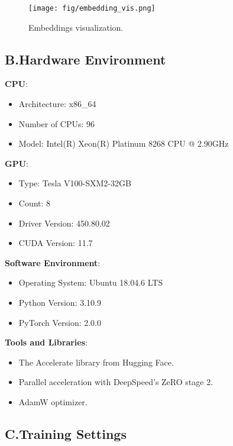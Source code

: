 \documentclass{article}
\begin{document}
\begin{figure*}[t!]
\centering
\texttt{[image: fig/embedding\_vis.png]}
\caption{Embeddings visualization.}
\label{fig: embedding_vis}
\end{figure*}

\subsection*{B.Hardware Environment}
\textbf{CPU}:
\begin{itemize}
\item Architecture: x86\_64
\item Number of CPUs: 96
\item Model: Intel(R) Xeon(R) Platinum 8268 CPU @ 2.90GHz
\end{itemize}

\textbf{GPU}:
\begin{itemize}
\item Type: Tesla V100-SXM2-32GB
\item Count: 8
\item Driver Version: 450.80.02
\item CUDA Version: 11.7
\end{itemize}

\textbf{Software Environment}:
\begin{itemize}
\item Operating System: Ubuntu 18.04.6 LTS
\item Python Version: 3.10.9
\item PyTorch Version: 2.0.0
\end{itemize}

\textbf{Tools and Libraries}:
\begin{itemize}
\item The Accelerate library from Hugging Face.
\item Parallel acceleration with DeepSpeed’s ZeRO stage 2.
\item AdamW optimizer.
\end{itemize}

\subsection*{C.Training Settings}
\end{document}
